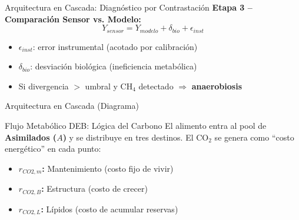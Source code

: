 \documentclass[aspectratio=169, 11pt]{beamer}
\begin{document}
\begin{frame}{Arquitectura en Cascada: Diagnóstico por Contrastación}
    \textbf{Etapa 3 -- Comparación Sensor vs. Modelo:}
    \vspace{0.3cm}
    \begin{equation*}
        Y_{sensor} = Y_{modelo} + \delta_{bio} + \epsilon_{inst}
    \end{equation*}
    \begin{itemize}
        \item $\epsilon_{inst}$: error instrumental (acotado por calibración)
        \item $\delta_{bio}$: desviación biológica (ineficiencia metabólica)
        \item Si divergencia $>$ umbral y CH$_4$ detectado $\Rightarrow$ \textbf{anaerobiosis}
    \end{itemize}
\end{frame}

\begin{frame}{Arquitectura en Cascada (Diagrama)}
    \centering
\end{frame}


\begin{frame}{Flujo Metabólico DEB: Lógica del Carbono}
    El alimento entra al pool de \textbf{Asimilados ($A$)} y se distribuye en tres destinos.
    El CO$_2$ se genera como ``costo energético'' en cada punto:
    \vspace{0.3cm}
    \begin{itemize}
        \item \textbf{$r_{CO2,m}$:} Mantenimiento (costo fijo de vivir)
        \item \textbf{$r_{CO2,B}$:} Estructura (costo de crecer)
        \item \textbf{$r_{CO2,L}$:} Lípidos (costo de acumular reservas)
    \end{itemize}
\end{frame}
\end{document}
